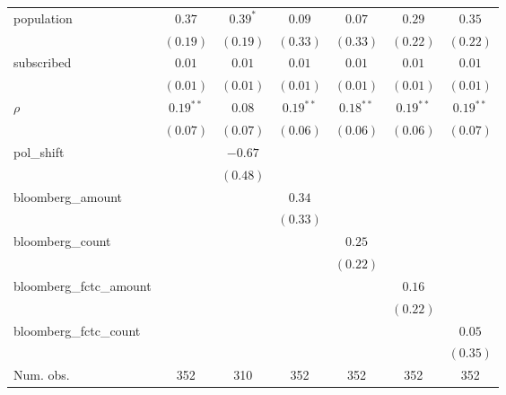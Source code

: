 \begin{table}[!h]
\begin{center}
\begin{tabular}{l c c c c c c }
population              & $0.37$       & $0.39^{*}$   & $0.09$       & $0.07$       & $0.29$       & $0.35$       \\
                        & $(0.19)$     & $(0.19)$     & $(0.33)$     & $(0.33)$     & $(0.22)$     & $(0.22)$     \\
subscribed              & $0.01$       & $0.01$       & $0.01$       & $0.01$       & $0.01$       & $0.01$       \\
                        & $(0.01)$     & $(0.01)$     & $(0.01)$     & $(0.01)$     & $(0.01)$     & $(0.01)$     \\
$\rho$                  & $0.19^{**}$  & $0.08$       & $0.19^{**}$  & $0.18^{**}$  & $0.19^{**}$  & $0.19^{**}$  \\
                        & $(0.07)$     & $(0.07)$     & $(0.06)$     & $(0.06)$     & $(0.06)$     & $(0.07)$     \\
pol\_shift              &              & $-0.67$      &              &              &              &              \\
                        &              & $(0.48)$     &              &              &              &              \\
bloomberg\_amount       &              &              & $0.34$       &              &              &              \\
                        &              &              & $(0.33)$     &              &              &              \\
bloomberg\_count        &              &              &              & $0.25$       &              &              \\
                        &              &              &              & $(0.22)$     &              &              \\
bloomberg\_fctc\_amount &              &              &              &              & $0.16$       &              \\
                        &              &              &              &              & $(0.22)$     &              \\
bloomberg\_fctc\_count  &              &              &              &              &              & $0.05$       \\
                        &              &              &              &              &              & $(0.35)$     \\
\midrule
Num. obs.               & 352          & 310          & 352          & 352          & 352          & 352          \\

\end{tabular}
\end{center}
\end{table}
